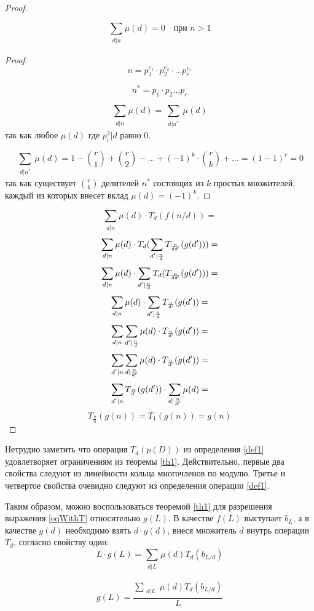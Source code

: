 \begin{proof}
  
\begin{lemma}
\[
  \sum_{\substack{d|n}}\mu(d)=0 \quad \text{при } n > 1
\]
\end{lemma}


\begin{proof}
  \[
  n = p_1^{e_1} \cdot p_2^{e_2} \cdot \ldots p_r^{e_r}
  \]

\[
n^{\ast}=p_1 \cdot p_2 \ldots p_r
\]

\[
\sum_{\substack{d|n}}\mu(d)=\sum_{\substack{d|n^{\ast}}}\mu(d)
\]
 так как любое $\mu(d)$ где $p_i^2|d$ равно $0$.
 
\[
\sum_{\substack{d|n^{\ast}}}\mu(d)=1-\binom{r}{1}+\binom{r}{2}-\dotsc+(-1)^k \cdot \binom{r}{k}+ \dotsc = (1-1)^r=0
\]
так как существует $\binom{r}{k}$ делителей $n^{\ast}$ состоящих из $k$ простых множителей,
каждый из которых внесет вклад $\mu(d)=(-1)^k$.
\end{proof}


\[
  \sum_{\substack{d|n}}\mu(d) \cdot T_d(f(n/d)) = 
\]
\[
  \sum_{\substack{d|n}}\mu(d) \cdot T_d(\sum_{\substack{d'|\frac{n}{d}}}T_{\frac{n}{dd`}}(g(d'))) =
\]
\[
  \sum_{\substack{d|n}}\mu(d) \cdot \sum_{\substack{d'|\frac{n}{d}}}T_d(T_{\frac{n}{dd`}}(g(d'))) =
\]
\[
  \sum_{\substack{d|n}}\mu(d) \cdot \sum_{\substack{d'|\frac{n}{d}}}T_{\frac{n}{d`}}(g(d')) =
\]
\[
  \sum_{\substack{d|n}}\sum_{\substack{d'|\frac{n}{d}}}\mu(d) \cdot T_{\frac{n}{d`}}(g(d')) =
\]
\[
  \sum_{\substack{d'|n}}\sum_{\substack{d|\frac{n}{d'}}}\mu(d) \cdot T_{\frac{n}{d`}}(g(d')) =
\]
\[
  \sum_{\substack{d'|n}}T_{\frac{n}{d`}}(g(d')) \cdot \sum_{\substack{d|\frac{n}{d'}}}\mu(d)  =
\]
\[
  T_{\frac{n}{n}}(g(n))  = T_1(g(n)) = g(n)
\]
\end{proof}

Нетрудно заметить что операция $T_d(p(D))$ из определения \ref{def1} удовлетворяет ограничениям
из теоремы \ref{th1}. Действительно, первые два свойства следуют из линейности кольца многочленов
по модулю. Третье и четвертое свойства очевидно следуют из определения операции \ref{def1}.

Таким образом, можно воспользоваться теоремой \ref{th1} для разрешения выражения \ref{eqWithT}
относительно $g(L)$. В качестве $f(L)$ выступает $b_L$, а в качестве $g(d)$ необходимо
взять $d \cdot g(d)$, внеся множитель $d$ внутрь операции $T_d$, согласно свойству один:
\[
  L \cdot g(L) = \sum_{\substack{d|L}}\mu(d)T_d(b_{L/d})
\]

\[
  g(L) = \frac{\sum_{\substack{d|L}}\mu(d)T_d(b_{L/d})}{L}
\]

